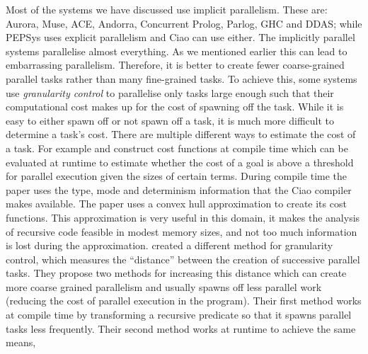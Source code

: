 Most of the systems we have discussed use implicit parallelism.
These are: Aurora, Muse, ACE, Andorra, Concurrent Prolog, Parlog, GHC and
DDAS;
while PEPSys uses explicit parallelism and Ciao can use either.
The implicitly parallel systems parallelise almost everything.
As we mentioned earlier this can lead to embarrassing parallelism.
Therefore, it is better to create fewer coarse-grained parallel tasks rather
than many fine-grained tasks.
To achieve this, some systems use \emph{granularity control}
\citep{debray:1990:granularity}
to parallelise only tasks large enough such that their computational cost
makes up for the cost of spawning off the task.
While it is easy to either spawn off or not spawn off a task,
it is much more difficult to determine a task's cost.
There are multiple different ways to estimate the cost of a task.
For example \citet{king:lower_bound_time_complexity} and
\citet{lopez96:granularity} construct cost functions
at compile time which can be evaluated at runtime to estimate
whether the cost of a goal is above a threshold for parallel execution given
the sizes of certain terms.
During compile time the \citeauthor{lopez96:granularity} paper 
uses the type, mode and determinism information that
the Ciao \citep{hermenegildo_ciao} compiler makes available.
The \citeauthor{king:lower_bound_time_complexity} paper uses a convex hull
approximation to create its cost functions.
This approximation is very useful in this domain,
it makes the analysis of recursive code feasible in modest memory sizes,
and not too much information is lost during the approximation.
\citet{shen_98_granularity-control} created a different method for
granularity control,
which measures the ``distance'' between the creation of successive parallel
tasks.
They propose two methods for increasing this distance which can create more
coarse grained parallelism and usually spawns off less parallel work
(reducing the cost of parallel execution in the program).
Their first method works at compile time by transforming a recursive
predicate so that it spawns parallel tasks less frequently.
Their second method works at runtime to achieve the same means,

